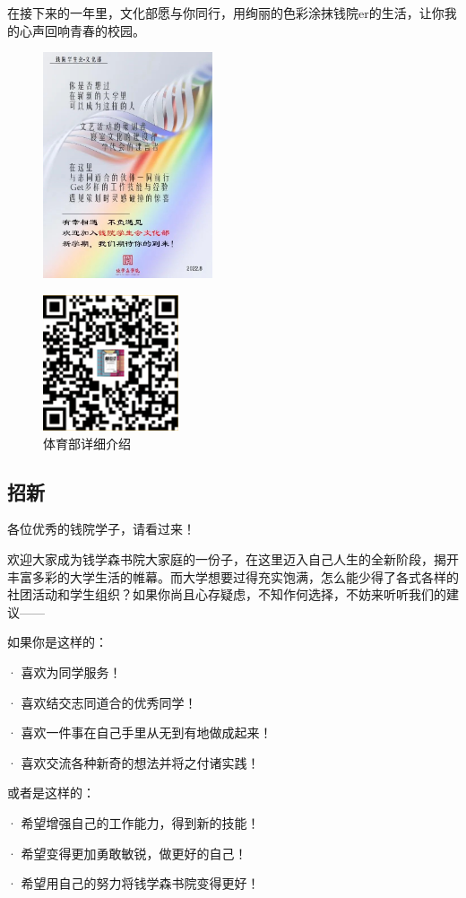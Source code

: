 \documentclass[
decoration,  %
]{qyxf-book}
\begin{document}
    在接下来的一年里，文化部愿与你同行，用绚丽的色彩涂抹钱院er的生活，让你我的心声回响青春的校园。
	\newpage
	\begin{figure}[htbp]
		\centering
		\includegraphics[align=c,width=5cm]{pics/whb.png}
		\end{figure}

	\begin{figure}[htbp]
	\centering
	\includegraphics[align=c,width=4cm]{pics/whbqrcode.png}
	\vspace{-2cm}
	\setlength{\abovecaptionskip}{2cm}
	\setlength{\belowcaptionskip}{1cm}
	\caption*{体育部详细介绍}
	\end{figure}
	
	\subsection{招新}
	各位优秀的钱院学子，请看过来！
	
    欢迎大家成为钱学森书院大家庭的一份子，在这里迈入自己人生的全新阶段，揭开丰富多彩的大学生活的帷幕。而大学想要过得充实饱满，怎么能少得了各式各样的社团活动和学生组织？如果你尚且心存疑虑，不知作何选择，不妨来听听我们的建议——
    
    如果你是这样的：
    
          · 喜欢为同学服务！\par
          · 喜欢结交志同道合的优秀同学！\par
          · 喜欢一件事在自己手里从无到有地做成起来！\par
          · 喜欢交流各种新奇的想法并将之付诸实践！\par
    或者是这样的：\par
          · 希望增强自己的工作能力，得到新的技能！\par
          · 希望变得更加勇敢敏锐，做更好的自己！\par
          · 希望用自己的努力将钱学森书院变得更好！
          
\end{document}

